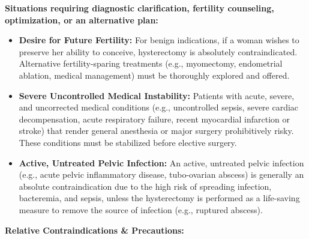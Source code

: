 \textbf{Situations requiring diagnostic clarification, fertility counseling, optimization, or an alternative plan:}

\begin{itemize}
  \item \textbf{Desire for Future Fertility:} For benign indications, if a woman wishes to preserve her ability to conceive, hysterectomy is absolutely contraindicated. Alternative fertility-sparing treatments (e.g., myomectomy, endometrial ablation, medical management) must be thoroughly explored and offered.

  \item \textbf{Severe Uncontrolled Medical Instability:} Patients with acute, severe, and uncorrected medical conditions (e.g., uncontrolled sepsis, severe cardiac decompensation, acute respiratory failure, recent myocardial infarction or stroke) that render general anesthesia or major surgery prohibitively risky. These conditions must be stabilized before elective surgery.

  \item \textbf{Active, Untreated Pelvic Infection:} An active, untreated pelvic infection (e.g., acute pelvic inflammatory disease, tubo-ovarian abscess) is generally an absolute contraindication due to the high risk of spreading infection, bacteremia, and sepsis, unless the hysterectomy is performed as a life-saving measure to remove the source of infection (e.g., ruptured abscess).
\end{itemize}

\textbf{Relative Contraindications \& Precautions:}

